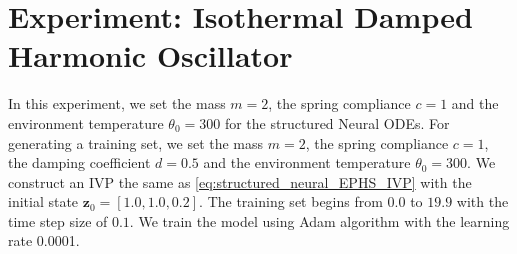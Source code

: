 \documentclass[
	parskip, 			   %
	twoside, 			   %
	DIV=14, 			   %
	BCOR=15.0mm, 		   %
	headsepline, 		   %
	open=right, 		   %
	captions=tableheading, %
	bibliography=totoc,    %
	numbers=noenddot       %
]{scrreprt}
\begin{document}
\clearpage
\section{Experiment: Isothermal Damped Harmonic Oscillator}
In this experiment, we set the mass $m=2$, the spring compliance $c=1$ and the environment temperature $\theta_{0}=300$ for the structured Neural ODEs. For generating a training set, we set the mass $m=2$, the spring compliance $c=1$, the damping coefficient $d=0.5$ and the environment temperature $\theta_{0}=300$. We construct an IVP the same as \ref{eq:structured_neural_EPHS_IVP} with the initial state $\mathbf{z}_{0} = [1.0, 1.0, 0.2]$. The training set begins from $0.0$ to $19.9$ with the time step size of $0.1$. We train the model using Adam algorithm with the learning rate 0.0001.
\end{document}

